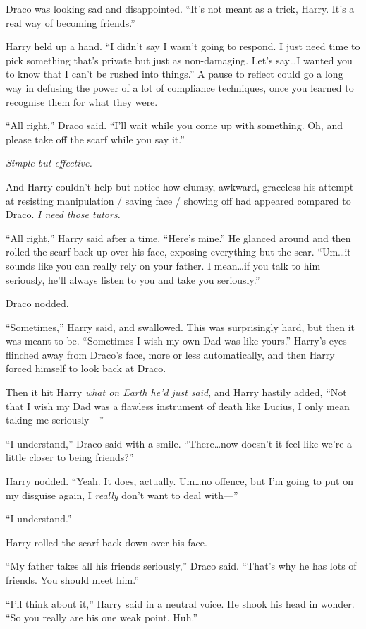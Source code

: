 Draco was looking sad and disappointed. “It’s not meant as a trick, Harry. It’s a real way of becoming friends.”

Harry held up a hand. “I didn’t say I wasn’t going to respond. I just need time to pick something that’s private but just as non-damaging. Let’s say…I wanted you to know that I can’t be rushed into things.” A pause to reflect could go a long way in defusing the power of a lot of compliance techniques, once you learned to recognise them for what they were.

“All right,” Draco said. “I’ll wait while you come up with something. Oh, and please take off the scarf while you say it.”

\emph{Simple but effective.}

And Harry couldn’t help but notice how clumsy, awkward, graceless his attempt at resisting manipulation / saving face / showing off had appeared compared to Draco. \emph{I need those tutors.}

“All right,” Harry said after a time. “Here’s mine.” He glanced around and then rolled the scarf back up over his face, exposing everything but the scar. “Um…it sounds like you can really rely on your father. I mean…if you talk to him seriously, he’ll always listen to you and take you seriously.”

Draco nodded.

“Sometimes,” Harry said, and swallowed. This was surprisingly hard, but then it was meant to be. “Sometimes I wish my own Dad was like yours.” Harry’s eyes flinched away from Draco’s face, more or less automatically, and then Harry forced himself to look back at Draco.

Then it hit Harry \emph{what on Earth he’d just said}, and Harry hastily added, “Not that I wish my Dad was a flawless instrument of death like Lucius, I only mean taking me seriously—”

“I understand,” Draco said with a smile. “There…now doesn’t it feel like we’re a little closer to being friends?”

Harry nodded. “Yeah. It does, actually. Um…no offence, but I’m going to put on my disguise again, I \emph{really} don’t want to deal with—”

“I understand.”

Harry rolled the scarf back down over his face.

“My father takes all his friends seriously,” Draco said. “That’s why he has lots of friends. You should meet him.”

“I’ll think about it,” Harry said in a neutral voice. He shook his head in wonder. “So you really are his one weak point. Huh.”

